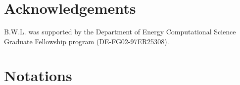 \documentclass[11pt]{article}
\theoremstyle{plain}
\theoremstyle{plain}
\numberwithin{equation}{section}
\numberwithin{lemma}{section}
\numberwithin{theorem}{section}
\numberwithin{corollary}{section}
\numberwithin{observation}{section}
\numberwithin{definition}{section}
\numberwithin{example}{section}
\begin{document}
 


\section*{Acknowledgements}
B.W.L. was supported by the Department of Energy Computational Science Graduate Fellowship program (DE-FG02-97ER25308).






\newpage

\renewcommand{\theHsection}{A\arabic{section}}
\appendix

\section{Notations} \label{app:notations}
\renewcommand{\theequation}{\Alph{section}.\arabic{equation}}
\renewcommand{\thefigure}{\Alph{section}.\arabic{figure}}
\end{document}
